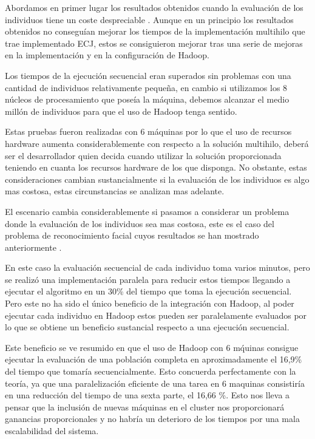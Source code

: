 Abordamos en primer lugar los resultados obtenidos cuando la evaluaci\'on de los individuos tiene un coste despreciable . Aunque en un principio los resultados obtenidos no consegu\'ian mejorar los tiempos de la implementaci\'on multihilo que trae implementado ECJ, estos se consiguieron mejorar tras una serie de mejoras en la implementaci\'on y en la configuraci\'on de Hadoop.

Los tiempos de la ejecuci\'on secuencial eran superados sin problemas con una cantidad de individuos relativamente peque\~na, en cambio si utilizamos los 8 núcleos de procesamiento que poseía la m\'aquina, debemos alcanzar el medio mill\'on de individuos para que el uso de Hadoop tenga sentido. 

Estas pruebas fueron realizadas con 6 m\'aquinas por lo que el uso de recursos hardware aumenta considerablemente con respecto a la soluci\'on multihilo, deber\'a ser el desarrollador quien decida cuando utilizar la soluci\'on proporcionada teniendo en cuanta los recursos hardware de los que disponga. No obstante, estas consideraciones cambian sustancialmente si la evaluaci\'on de los individuos es algo mas costosa, estas circunstancias se analizan mas adelante.


El escenario cambia considerablemente si pasamos a considerar un problema donde la evaluaci\'on de los individuos sea mas costosa, este es el caso del problema de reconocimiento facial cuyos resultados se han mostrado anteriormente . 

En este caso la evaluaci\'on secuencial de cada individuo toma varios minutos, pero se realiz\'o una implementaci\'on paralela para reducir estos tiempos llegando a ejecutar el algoritmo en un 30\% del tiempo que toma la ejecuci\'on secuencial. Pero este no ha sido el \'unico beneficio de la integraci\'on con Hadoop, al poder ejecutar cada individuo en Hadoop estos pueden ser paralelamente evaluados por lo que se obtiene un beneficio sustancial respecto a una ejecuci\'on secuencial. 

Este beneficio se ve resumido en que el uso de Hadoop con 6 m\'quinas consigue ejecutar la evaluación de una población completa en aproximadamente el 16,9\% del tiempo que tomar\'ia secuencialmente. Esto concuerda perfectamente con la teoría, ya que una paralelizaci\'on eficiente de una tarea en 6 maquinas consistiría en una reducción del tiempo de una sexta parte, el 
16,66 \%. Esto nos lleva a pensar que la inclusi\'on de nuevas m\'aquinas en el cluster nos proporcionar\'a ganancias proporcionales y no habr\'ia un deterioro de los tiempos por una mala escalabilidad del sistema.

